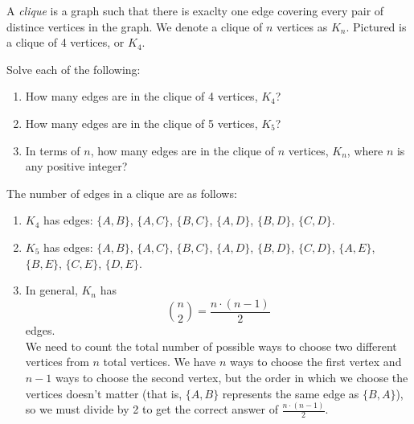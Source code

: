 \documentclass[11pt]{article}
\begin{document}
\begin{definition}
\label{def:clique}
A \textit{clique} is a graph such that there is exaclty one edge covering every pair of distince vertices in the graph.
We denote a clique of $n$ vertices as $K_n$.
Pictured is a clique of 4 vertices, or $K_4$.
\begin{center}
\end{center}
\end{definition}

\begin{problem} %
Solve each of the following:
\begin{enumerate}[label=(\alph*)]
\item How many edges are in the clique of 4 vertices, $K_4$?
\item How many edges are in the clique of 5 vertices, $K_5$?
\item In terms of $n$, how many edges are in the clique of $n$ vertices, $K_n$, where $n$ is any positive integer?
\end{enumerate}
\end{problem}

\begin{solution} 
The number of edges in a clique are as follows:
\begin{enumerate}[label=(\alph*)]
\item $K_4$ has  edges: $\{A, B\}$, $\{A, C\}$, $\{B, C\}$, $\{A, D\}$, $\{B, D\}$, $\{C, D\}$.
\item $K_5$ has  edges: $\{A, B\}$, $\{A, C\}$, $\{B, C\}$, $\{A, D\}$, $\{B, D\}$, $\{C, D\}$, $\{A, E\}$, $\{B, E\}$, $\{C, E\}$, $\{D,E\}$.
\item In general, $K_n$ has
\[\binom{n}{2} = \boxed{\frac{n \cdot (n - 1)}{2}}\]
edges. \\
We need to count the total number of possible ways to choose two different vertices from $n$ total vertices. We have $n$ ways to choose the first vertex
and $n - 1$ ways to choose the second vertex, but the order in which we choose the vertices doesn't matter (that is, $\{A,B\}$ represents the same edge
as $\{B, A\}$), so we must divide by 2 to get the correct answer of $\frac{n \cdot (n - 1)}{2}$.
\end{enumerate}
\end{solution}
\end{document}

